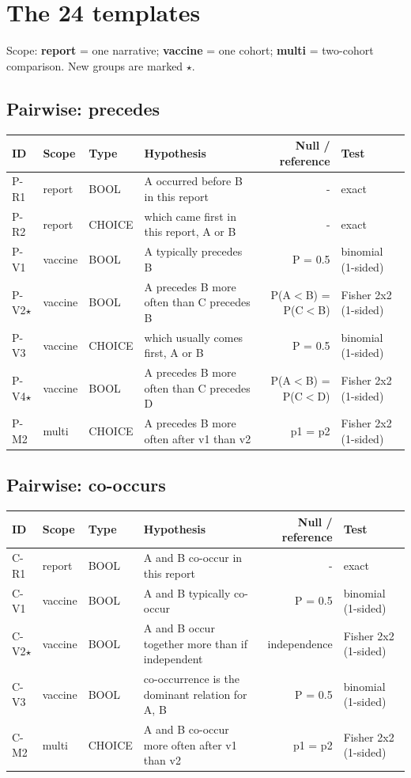 \documentclass[11pt]{article}
\begin{document}
\section*{The 24 templates}
Scope: \textbf{report} = one narrative; \textbf{vaccine} = one cohort; \textbf{multi} = two-cohort comparison. New groups are marked $\star$.
\subsection*{Pairwise: precedes}
\noindent\begin{tabularx}{\linewidth}{lllWNT}
\toprule
\textbf{ID} & \textbf{Scope} & \textbf{Type} & \textbf{Hypothesis} & \textbf{Null / reference} & \textbf{Test} \\
\midrule
P-R1 & report & BOOL & A occurred before B in this report & - & exact \\
P-R2 & report & CHOICE & which came first in this report, A or B & - & exact \\
P-V1 & vaccine & BOOL & A typically precedes B & P = 0.5 & binomial (1-sided) \\
P-V2$\star$ & vaccine & BOOL & A precedes B more often than C precedes B & P(A$<$B) = P(C$<$B) & Fisher 2x2 (1-sided) \\
P-V3 & vaccine & CHOICE & which usually comes first, A or B & P = 0.5 & binomial (1-sided) \\
P-V4$\star$ & vaccine & BOOL & A precedes B more often than C precedes D & P(A$<$B) = P(C$<$D) & Fisher 2x2 (1-sided) \\
P-M2 & multi & CHOICE & A precedes B more often after v1 than v2 & p1 = p2 & Fisher 2x2 (1-sided) \\
\bottomrule
\end{tabularx}
\subsection*{Pairwise: co-occurs}
\noindent\begin{tabularx}{\linewidth}{lllWNT}
\toprule
\textbf{ID} & \textbf{Scope} & \textbf{Type} & \textbf{Hypothesis} & \textbf{Null / reference} & \textbf{Test} \\
\midrule
C-R1 & report & BOOL & A and B co-occur in this report & - & exact \\
C-V1 & vaccine & BOOL & A and B typically co-occur & P = 0.5 & binomial (1-sided) \\
C-V2$\star$ & vaccine & BOOL & A and B occur together more than if independent & independence & Fisher 2x2 (1-sided) \\
C-V3 & vaccine & BOOL & co-occurrence is the dominant relation for A, B & P = 0.5 & binomial (1-sided) \\
C-M2 & multi & CHOICE & A and B co-occur more often after v1 than v2 & p1 = p2 & Fisher 2x2 (1-sided) \\
\bottomrule
\end{tabularx}
\end{document}
